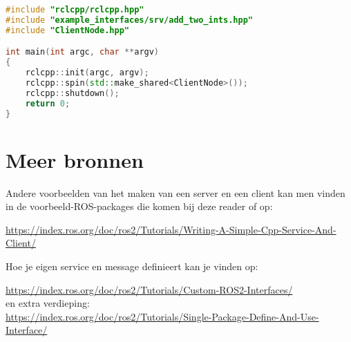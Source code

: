 \begin{lstlisting}[language=C++, caption={mainClient.cpp}, firstnumber=0, label={code:client_main}]
#include "rclcpp/rclcpp.hpp"
#include "example_interfaces/srv/add_two_ints.hpp"
#include "ClientNode.hpp"

int main(int argc, char **argv)
{
    rclcpp::init(argc, argv);
    rclcpp::spin(std::make_shared<ClientNode>());
    rclcpp::shutdown();
    return 0;
}
\end{lstlisting}


\section{Meer bronnen}
\label{sec:service_andere_bronnen}
Andere voorbeelden van het maken van een server en een client kan men vinden in de voorbeeld-ROS-packages die komen bij deze reader of op:
\begin{center}
{\footnotesize \url{ https://index.ros.org/doc/ros2/Tutorials/Writing-A-Simple-Cpp-Service-And-Client/}} \\
\end{center}
\noindent Hoe je eigen service en message definieert kan je vinden op:
\begin{center}
    {\footnotesize \url{https://index.ros.org/doc/ros2/Tutorials/Custom-ROS2-Interfaces/}}\\
    en extra verdieping: \\
    {\footnotesize \url{https://index.ros.org/doc/ros2/Tutorials/Single-Package-Define-And-Use-Interface/}}
\end{center}

